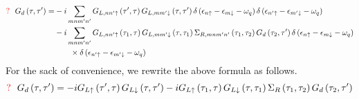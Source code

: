 \begin{equation}
\begin{split}
{\color{red}{\Large{?}}}~~G_{d}\left(\tau, \tau^{\prime}\right)=&-i \sum_{mnm'n'}G_{L,nn' \uparrow}\left(\tau^{\prime}, \tau\right) G_{L,mm' \downarrow}\left(\tau, \tau^{\prime}\right)\delta\left(\epsilon_{n \uparrow}-\epsilon_{m \downarrow}-\omega_{q}\right) \delta\left(\epsilon_{n' \uparrow}-\epsilon_{m' \downarrow}-\omega_{q}\right)\\
&-i \sum_{mnm'n'}G_{L,nn' \uparrow}\left(\tau_{1}, \tau\right) G_{L,mm' \downarrow}\left(\tau, \tau_{1}\right) \Sigma_{R,mnm'n'}\left(\tau_{1}, \tau_{2}\right) G_{d}\left(\tau_{2}, \tau^{\prime}\right) \delta\left(\epsilon_{n \uparrow}-\epsilon_{m \downarrow}-\omega_{q}\right)\\
&\qquad\times \delta\left(\epsilon_{n' \uparrow}-\epsilon_{m' \downarrow}-\omega_{q}\right)
\label{eq:1}
\end{split}
\end{equation}
For the sack of convenience, we rewrite the above formula as follows.
\begin{equation}
{\color{red}{\Large{?}}}~~G_{d}\left(\tau, \tau^{\prime}\right)=-i G_{L \uparrow}\left(\tau^{\prime}, \tau\right) G_{L \downarrow}\left(\tau, \tau^{\prime}\right)-i G_{L \uparrow}\left(\tau_{1}, \tau\right) G_{L \downarrow}\left(\tau, \tau_{1}\right) \Sigma_{R }\left(\tau_{1}, \tau_{2}\right) G_{d}\left(\tau_{2}, \tau^{\prime}\right)
\label{eq:1}
\end{equation}
